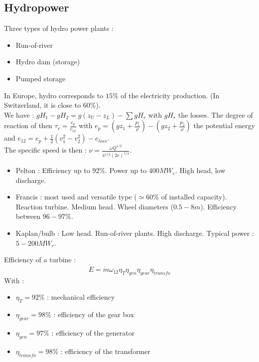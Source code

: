 \documentclass[../main.tex]{subfiles}
\begin{document}
\subsection{Hydropower}
Three types of hydro power plants : \begin{itemize}
    \item Run-of-river
    \item Hydro dam (storage)
    \item Pumped storage
\end{itemize}

In Europe, hydro corresponds to $15\%$ of the electricity production. (In Switzerland, it is close to $60\%$).\\
We have : $gH_1 - gH_2 = g(z_U-z_L) - \sum gH_r$ with $gH_r$ the losses. The degree of reaction of then $\tau_r = \frac{e_p}{e_{12}}$ with $e_p = (gz_1 + \frac{P_1}{\rho}) - (gz_2 + \frac{P_2}{\rho})$ the potential energy and $e_{12} = e_p + \frac{1}{2} (v_1^2 - v_2^2) - e_{loss}$. \\
The specific speed is then : $\nu = \frac{\omega Q^{1/2}}{\pi^{1/2} (2e)^{1/4}}$.\\

\begin{itemize}
    \item Pelton : Efficiency up to $92\%$. Power up to $400MW_e$. High head, low discharge.
    \item Francis : most used and versatile type ($\simeq 60\%$ of installed capacity). Reaction turbine. Medium head. Wheel diameters ($0.5-8m$). Efficiency between $96-97\%$.
    \item Kaplan/bulb : Low head. Run-of-river plants. High discharge. Typical power : $5-200MW_e$.
\end{itemize}

Efficiency of a turbine : \begin{equation}
    \dot{E} = \dot{m} \omega_{12} \eta_T \eta_{gen} \eta_{gear} \eta_{transfo}
\end{equation}
With : \begin{itemize}
    \item $\eta_T = 92\%$ : mechanical efficiency
    \item $\eta_{gear} = 98\%$ : efficiency of the gear box
    \item $\eta_{gen} = 97\%$ : efficiency of the generator
    \item $\eta_{transfo} =98\%$ : efficiency of the transformer
\end{itemize}
\end{document}
